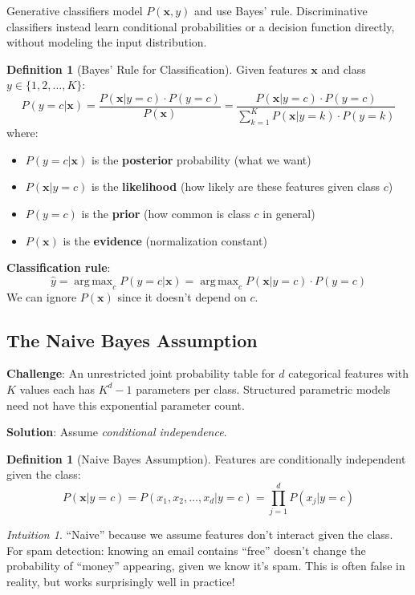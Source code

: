 \documentclass[11pt,twoside]{article}
\numberwithin{equation}{section}
\DeclareMathOperator*{\argmax}{arg\,max}
\newcommand{\vect}[1]{\bm{#1}}
\theoremstyle{plain}
\theoremstyle{definition}
\newtheorem{definition}[theorem]{Definition}
\theoremstyle{remark}
\newtheorem{intuition}[theorem]{Intuition}
\begin{document}
Generative classifiers model $P(\vect{x},y)$ and use Bayes' rule. Discriminative classifiers instead learn conditional probabilities or a decision function directly, without modeling the input distribution.

\begin{definition}[Bayes' Rule for Classification]
Given features $\vect{x}$ and class $y \in \{1, 2, \ldots, K\}$:
\[
P(y = c | \vect{x}) = \frac{P(\vect{x} | y = c) \cdot P(y = c)}{P(\vect{x})} = \frac{P(\vect{x} | y = c) \cdot P(y = c)}{\sum_{k=1}^K P(\vect{x} | y = k) \cdot P(y = k)}
\]
where:
\begin{itemize}
\item $P(y=c|\vect{x})$ is the \textbf{posterior} probability (what we want)
\item $P(\vect{x}|y=c)$ is the \textbf{likelihood} (how likely are these features given class $c$)
\item $P(y=c)$ is the \textbf{prior} (how common is class $c$ in general)
\item $P(\vect{x})$ is the \textbf{evidence} (normalization constant)
\end{itemize}
\end{definition}

\textbf{Classification rule}: 
\[
\hat{y} = \argmax_{c} P(y=c|\vect{x}) = \argmax_{c} P(\vect{x}|y=c) \cdot P(y=c)
\]
We can ignore $P(\vect{x})$ since it doesn't depend on $c$.

\subsection{The Naive Bayes Assumption}

\textbf{Challenge}: An unrestricted joint probability table for $d$ categorical features with $K$ values each has $K^d-1$ parameters per class. Structured parametric models need not have this exponential parameter count.

\textbf{Solution}: Assume \emph{conditional independence}.

\begin{definition}[Naive Bayes Assumption]
Features are conditionally independent given the class:
\[
P(\vect{x} | y = c) = P(x_1, x_2, \ldots, x_d | y = c) = \prod_{j=1}^d P(x_j | y = c)
\]
\end{definition}

\begin{intuition}
``Naive'' because we assume features don't interact given the class. For spam detection: knowing an email contains ``free'' doesn't change the probability of ``money'' appearing, given we know it's spam. This is often false in reality, but works surprisingly well in practice!
\end{intuition}
\end{document}
